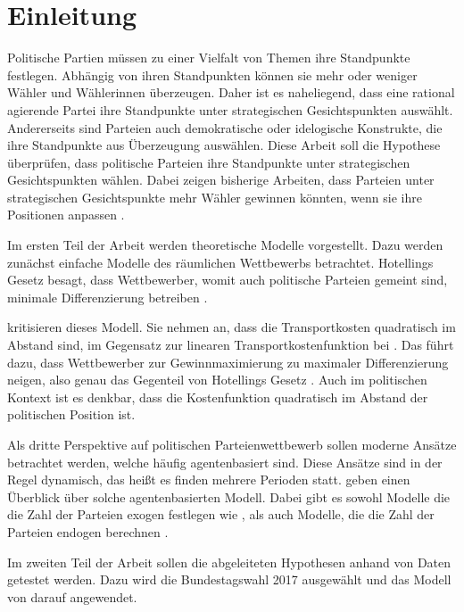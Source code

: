 
\chapter{Einleitung}\label{Kap-Einleitung}
Politische Partien müssen zu einer Vielfalt von Themen ihre Standpunkte festlegen.
Abhängig von ihren Standpunkten können sie mehr oder weniger Wähler und Wählerinnen überzeugen.
Daher ist es naheliegend, dass eine rational agierende Partei ihre Standpunkte unter strategischen Gesichtspunkten auswählt.
Andererseits sind Parteien auch demokratische oder idelogische Konstrukte, die ihre Standpunkte aus Überzeugung auswählen.
Diese Arbeit soll die Hypothese überprüfen, dass politische Parteien ihre Standpunkte unter strategischen Gesichtspunkten wählen.
Dabei zeigen bisherige Arbeiten, dass Parteien unter strategischen Gesichtspunkte mehr Wähler gewinnen könnten, wenn sie ihre Positionen anpassen \citep[S.\,257]{schofield1998germany}.

Im ersten Teil der Arbeit werden theoretische Modelle vorgestellt.
Dazu werden  zunächst einfache Modelle des räumlichen Wettbewerbs betrachtet.
Hotellings Gesetz besagt, dass Wettbewerber, womit auch politische Parteien gemeint sind, minimale Differenzierung betreiben \citep[S.\,54-55]{hotelling1929}.

\citet{aspremont1979} kritisieren dieses Modell.
Sie nehmen an, dass die Transportkosten quadratisch im Abstand sind, im Gegensatz zur linearen Transportkostenfunktion bei \citet{hotelling1929}.
Das führt dazu, dass Wettbewerber zur Gewinnmaximierung zu maximaler Differenzierung neigen, also genau das Gegenteil von Hotellings Gesetz \citep[S.\,1149]{aspremont1979}.
Auch im politischen Kontext ist es denkbar, dass die Kostenfunktion quadratisch im Abstand der politischen Position ist.

Als dritte Perspektive auf politischen Parteienwettbewerb sollen moderne Ansätze betrachtet werden, welche häufig agentenbasiert sind.
Diese Ansätze sind in der Regel dynamisch, das heißt es finden mehrere Perioden statt.
\citet{marchi2014ABMs} geben einen Überblick über solche agentenbasierten Modell.
Dabei gibt es sowohl Modelle die die Zahl der Parteien exogen festlegen wie \citet{laver2005policy}, als auch Modelle, die die Zahl der Parteien endogen berechnen \citep{laver2007endogenousParties}.

Im zweiten Teil der Arbeit sollen die abgeleiteten Hypothesen anhand von Daten getestet werden.
Dazu wird die Bundestagswahl 2017 ausgewählt und das Modell von \citet{laver2005policy} darauf angewendet.

